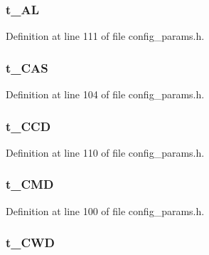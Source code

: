\subsubsection[{t\_\-AL}]{ {\bf t\_\-AL}}\label{config__params_8h_00d8a8f3f7c90331db7294a4766e73cf}




Definition at line 111 of file config\_\-params.h.
\subsubsection[{t\_\-CAS}]{ {\bf t\_\-CAS}}\label{config__params_8h_3650e278079b6a0bf6732709f2637bad}




Definition at line 104 of file config\_\-params.h.
\subsubsection[{t\_\-CCD}]{ {\bf t\_\-CCD}}\label{config__params_8h_678432cf3d4dac2a1d3880f336cc8044}




Definition at line 110 of file config\_\-params.h.
\subsubsection[{t\_\-CMD}]{ {\bf t\_\-CMD}}\label{config__params_8h_efe4d57151bd8153618cfa15165705ef}




Definition at line 100 of file config\_\-params.h.
\subsubsection[{t\_\-CWD}]{ {\bf t\_\-CWD}}\label{config__params_8h_8e5df97e5c05a4940306cb3f09749cfc}




